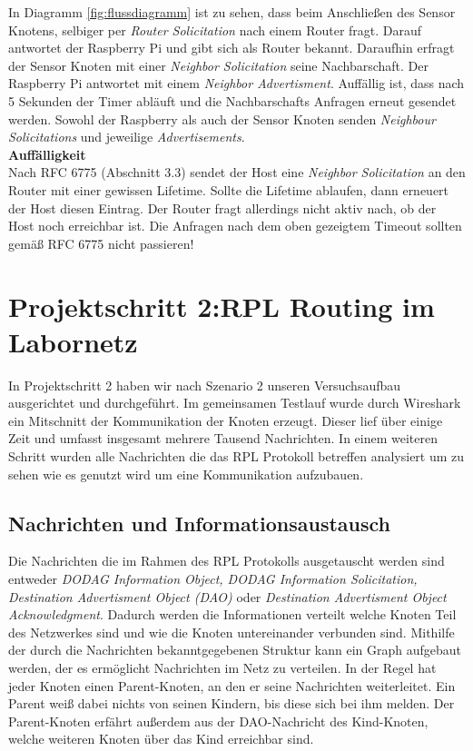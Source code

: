 \documentclass[]{scrartcl}
\begin{document}
In Diagramm \ref{fig:flussdiagramm} ist zu sehen, dass beim Anschließen des Sensor Knotens, selbiger per \textit{Router Solicitation} nach einem Router fragt. Darauf antwortet der Raspberry Pi und gibt sich als Router bekannt. Daraufhin erfragt der Sensor Knoten mit einer \textit{Neighbor Solicitation} seine Nachbarschaft. Der Raspberry Pi antwortet mit einem \textit{Neighbor Advertisment}. Auffällig ist, dass nach 5 Sekunden der Timer abläuft und die Nachbarschafts Anfragen erneut gesendet werden. Sowohl der Raspberry als auch der Sensor Knoten senden \textit{Neighbour Solicitations} und jeweilige \textit{Advertisements}.\\

\textbf{Auffälligkeit}\\
Nach RFC 6775 (Abschnitt 3.3) sendet der Host eine \textit{Neighbor Solicitation} an den Router mit einer gewissen Lifetime. Sollte die Lifetime ablaufen, dann erneuert der Host diesen Eintrag. Der Router fragt allerdings nicht aktiv nach, ob der Host noch erreichbar ist. Die Anfragen nach dem oben gezeigtem Timeout sollten gemäß RFC 6775 nicht passieren!


\section{Projektschritt 2:RPL Routing im Labornetz}
In Projektschritt 2 haben wir nach Szenario 2 unseren Versuchsaufbau ausgerichtet und durchgeführt. Im gemeinsamen Testlauf wurde durch Wireshark ein Mitschnitt der Kommunikation der Knoten erzeugt. Dieser lief über einige Zeit und umfasst insgesamt mehrere Tausend Nachrichten. In einem weiteren Schritt wurden alle Nachrichten die das RPL Protokoll betreffen analysiert um zu sehen wie es genutzt wird um eine Kommunikation aufzubauen. 

\subsection{Nachrichten und Informationsaustausch}
Die Nachrichten die im Rahmen des RPL Protokolls ausgetauscht werden sind entweder \textit{DODAG Information Object, DODAG Information Solicitation, Destination Advertisment Object (DAO)} oder \textit{Destination Advertisment Object Acknowledgment}. Dadurch werden die Informationen verteilt welche Knoten Teil des Netzwerkes sind und wie die Knoten untereinander verbunden sind. Mithilfe der durch die Nachrichten bekanntgegebenen Struktur kann ein Graph aufgebaut werden, der es ermöglicht Nachrichten im Netz zu verteilen. In der Regel hat jeder Knoten einen Parent-Knoten, an den er seine Nachrichten weiterleitet. Ein Parent weiß dabei nichts von seinen Kindern, bis diese sich bei ihm melden. Der Parent-Knoten erfährt außerdem aus der DAO-Nachricht des Kind-Knoten, welche weiteren Knoten über das Kind erreichbar sind.
\end{document}
